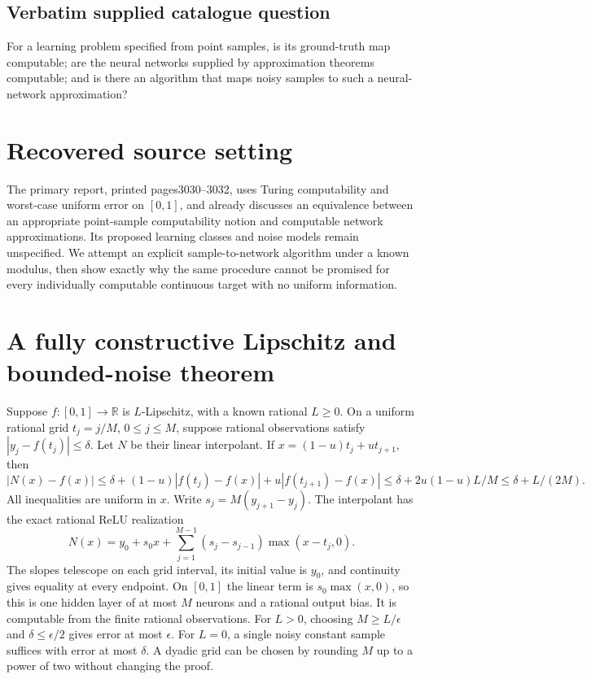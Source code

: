 \documentclass[11pt]{article}
\begin{document}
\subsection{Verbatim supplied catalogue question}
For a learning problem specified from point samples, is its ground-truth map computable; are the neural networks supplied by approximation theorems computable; and is there an algorithm that maps noisy samples to such a neural-network approximation?

\section{Recovered source setting}
The primary report, printed pages3030--3032, uses Turing
computability and worst-case uniform error on $[0,1]$, and
already discusses an equivalence between an appropriate
point-sample computability notion and computable network
approximations. Its proposed learning classes and noise models
remain unspecified. We attempt an explicit sample-to-network
algorithm under a known modulus, then show exactly why the
same procedure cannot be promised for every individually
computable continuous target with no uniform information.

\section{A fully constructive Lipschitz and bounded-noise theorem}
Suppose $f:[0,1]\to\mathbb R$ is $L$-Lipschitz, with a known
rational $L\ge0$. On a uniform rational grid
$t_j=j/M$, $0\le j\le M$, suppose rational observations satisfy
$|y_j-f(t_j)|\le\delta$. Let $N$ be their linear interpolant.
If $x=(1-u)t_j+ut_{j+1}$, then
\[
 |N(x)-f(x)|\le\delta+
 (1-u)|f(t_j)-f(x)|+u|f(t_{j+1})-f(x)|
 \le\delta+2u(1-u)L/M\le\delta+L/(2M).
\]
All inequalities are uniform in $x$. Write
$s_j=M(y_{j+1}-y_j)$. The interpolant has the exact rational
ReLU realization
\[
 N(x)=y_0+s_0x+\sum_{j=1}^{M-1}(s_j-s_{j-1})\max(x-t_j,0).
\]
The slopes telescope on each grid interval, its initial value
is $y_0$, and continuity gives equality at every endpoint.
On $[0,1]$ the linear term is $s_0\max(x,0)$, so this is
one hidden layer of at most $M$ neurons and a rational output
bias. It is computable from the finite rational observations.
For $L>0$, choosing $M\ge L/\epsilon$ and
$\delta\le\epsilon/2$ gives error at most $\epsilon$.
For $L=0$, a single noisy constant sample suffices with error
at most $\delta$. A dyadic grid can be chosen by rounding $M$
up to a power of two without changing the proof.
\end{document}
